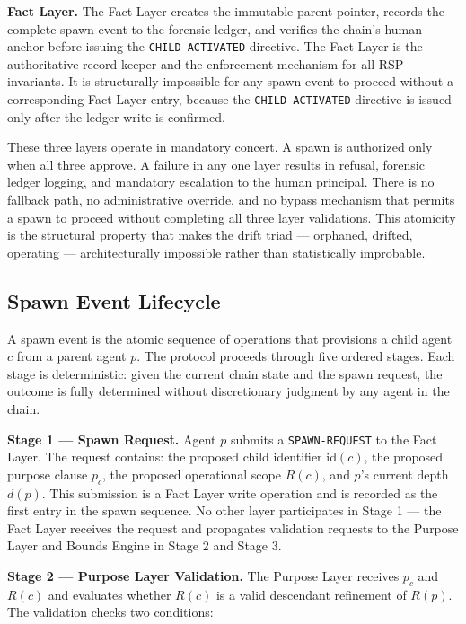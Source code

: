 \medskip
\noindent\textbf{Fact Layer.} The Fact Layer creates the immutable parent pointer, records the complete spawn event to the forensic ledger, and verifies the chain's human anchor before issuing the \texttt{CHILD-ACTIVATED} directive. The Fact Layer is the authoritative record-keeper and the enforcement mechanism for all RSP invariants. It is structurally impossible for any spawn event to proceed without a corresponding Fact Layer entry, because the \texttt{CHILD-ACTIVATED} directive is issued only after the ledger write is confirmed.

These three layers operate in mandatory concert. A spawn is authorized only when all three approve. A failure in any one layer results in refusal, forensic ledger logging, and mandatory escalation to the human principal. There is no fallback path, no administrative override, and no bypass mechanism that permits a spawn to proceed without completing all three layer validations. This atomicity is the structural property that makes the drift triad — orphaned, drifted, operating — architecturally impossible rather than statistically improbable.

\subsection{Spawn Event Lifecycle}

A spawn event is the atomic sequence of operations that provisions a child agent $c$ from a parent agent $p$. The protocol proceeds through five ordered stages. Each stage is deterministic: given the current chain state and the spawn request, the outcome is fully determined without discretionary judgment by any agent in the chain.

\bigskip
\noindent\textbf{Stage 1 — Spawn Request.} Agent $p$ submits a \texttt{SPAWN-REQUEST} to the Fact Layer. The request contains: the proposed child identifier $\mathrm{id}(c)$, the proposed purpose clause $p_c$, the proposed operational scope $R(c)$, and $p$'s current depth $d(p)$. This submission is a Fact Layer write operation and is recorded as the first entry in the spawn sequence. No other layer participates in Stage 1 — the Fact Layer receives the request and propagates validation requests to the Purpose Layer and Bounds Engine in Stage 2 and Stage 3.

\bigskip
\noindent\textbf{Stage 2 — Purpose Layer Validation.} The Purpose Layer receives $p_c$ and $R(c)$ and evaluates whether $R(c)$ is a valid descendant refinement of $R(p)$. The validation checks two conditions:

